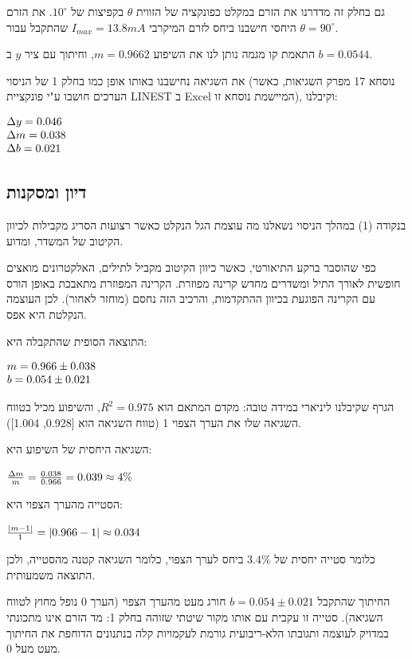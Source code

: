 \documentclass[14pt]{extarticle}
\makeatletter
\newenvironment{lefteqs}{%
    \begin{english}%
    \begin{flushleft}%
    \renewcommand{\arraystretch}{1.3}%
    $\begin{array}{@{}l@{}}%
}{%
    \end{array}$%
    \end{flushleft}%
    \end{english}%
}
\makeatother
\begin{document}
גם בחלק זה מדדרנו את הזרם במקלט כפונקציה של הזווית $\theta$ בקפיצות של $10^\circ$.
את הזרם היחסי חישבנו ביחס לזרם המיקרבי $I_{max} = 13.8 mA$ שהתקבל עבור $\theta = 90^\circ$.

התאמת קו מגמה נותן לנו את השיפוע $m=0.9662$, וחיתוך עם ציר $y$ ב $b=0.0544$.

את השגיאה נחישבנו באותו אופן כמו בחלק 1 של הניסוי (נוסחא 17 מפרק השגיאות, כאשר הערכים חושבו ע"י פונקציית LINEST ב Excel המיישמת  נוסחא זו), וקיבלנו:
\begin{lefteqs}
    \Delta y = 0.046 \\
    \Delta m = 0.038 \\
    \Delta b = 0.021
\end{lefteqs}

\subsection*{דיון ומסקנות}
בנקודה (1) במהלך הניסוי נשאלנו מה עוצמת הגל הנקלט כאשר רצועות הסריג מקבילות לכיוון הקיטוב של המשדר, ומדוע.

כפי שהוסבר ברקע התיאורטי, כאשר כיוון הקיטוב מקביל לתילים, האלקטרונים מואצים חופשית לאורך התיל ומשדרים מחדש קרינה מפוזרת. הקרינה המפוזרת מתאבכת באופן הורס עם הקרינה הפוגעת בכיוון ההתקדמות, והרכיב הזה נחסם (מוחזר לאחור). לכן העוצמה הנקלטת היא אפס.

התוצאה הסופית שהתקבלה היא:
\begin{lefteqs}
    m = 0.966 \pm 0.038 \\
    b = 0.054 \pm 0.021
\end{lefteqs}

הגרף שקיבלנו ליניארי במידה טובה: מקדם המתאם הוא $R^2 = 0.975$, והשיפוע מכיל בטווח השגיאה שלו
את הערך הצפוי 1 (טווח השגיאה הוא [0.928, 1.004]).

השגיאה היחסית של השיפוע היא:
\begin{lefteqs}
    \frac{\Delta m}{m} = \frac{0.038}{0.966} = 0.039 \approx 4\%
\end{lefteqs}

הסטייה מהערך הצפוי היא:
\begin{lefteqs}
    \frac{|m - 1|}{1} = |0.966 - 1| \approx 0.034
\end{lefteqs}

כלומר סטייה יחסית של $3.4\%$ ביחס לערך הצפוי, כלומר השגיאה קטנה מהסטייה, ולכן התוצאה משמעותית.

החיתוך שהתקבל $b=0.054 \pm 0.021$ חורג מעט מהערך הצפוי (הערך 0 נופל מחוץ לטווח השגיאה).
סטייה זו עקבית עם אותו מקור שיטתי שזוהה בחלק 1: מד הזרם אינו מתכונתי במדויק לעוצמה ותגובתו הלא-ריבועית גורמת לעקמויות קלה בנתנונים הדוחפת את החיתוך מעט מעל 0.
\end{document}
